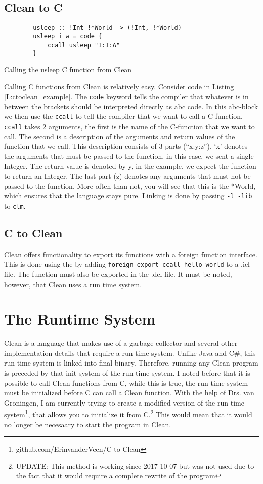 \documentclass{scrartcl}
\newenvironment{longlisting}{\captionsetup{type=listing}}{}
\begin{document}
\subsection{Clean to C}
\begin{longlisting}
	\begin{verbatim}
		usleep :: !Int !*World -> (!Int, !*World)
		usleep i w = code {
			ccall usleep "I:I:A"
		}
	\end{verbatim}
	\caption{Calling the usleep C function from Clean\label{L:ctoclean_example}}
\end{longlisting}
Calling C functions from Clean is relatively easy.
Consider code in Listing \ref{L:ctoclean_example}.
The \texttt{code} keyword tells the compiler that whatever is in between the brackets should be interpreted directly as abc code.
In this abc-block we then use the \texttt{ccall} to tell the compiler that we want to call a C-function.
\texttt{ccall} takes 2 arguments, the first is the name of the C-function that we want to call.
The second is a description of the arguments and return values of the function that we call.
This description consists of 3 parts (``x:y:z'').
`x' denotes the arguments that must be passed to the function, in this case, we sent a single Integer.
The return value is denoted by y, in the example, we expect the function to return an Integer.
The last part (z) denotes any arguments that must not be passed to the function.
More often than not, you will see that this is the *World, which ensures that the language stays pure.
Linking is done by passing \texttt{-l -lib} to \texttt{clm}.

\subsection{C to Clean}
Clean offers functionality to export its functions with a foreign function interface.
This is done using the by adding \texttt{foreign export ccall hello_world} to a .icl file.
The function must also be exported in the .dcl file.
It must be noted, however, that Clean uses a run time system.

\section{The Runtime System}
Clean is a language that makes use of a garbage collector and several other implementation details that require a run time system.
Unlike Java and C\#, this run time system is linked into final binary.
Therefore, running any Clean program is preceded by that init system of the run time system.
I noted before that it is possible to call Clean functions from C, while this is true, the run time system must be initialized before C can call a Clean function.
With the help of Drs. van Groningen, I am currently trying to create a modified version of the run time system\footnote{github.com/ErinvanderVeen/C-to-Clean}, that allows you to initialize it from C.\footnote{UPDATE: This method is working since 2017-10-07 but was not used due to the fact that it would require a complete rewrite of the program}
This would mean that it would no longer be necesaary to start the program in Clean.
\end{document}
